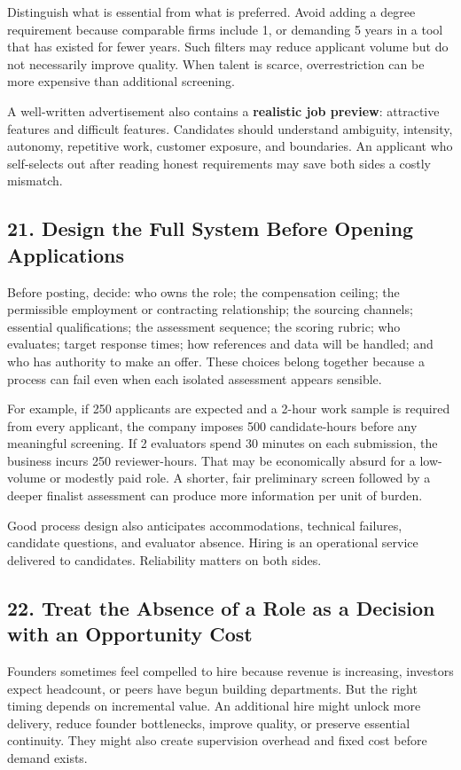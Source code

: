 Distinguish what is essential from what is preferred. Avoid adding a degree requirement because comparable firms include 1, or demanding 5 years in a tool that has existed for fewer years. Such filters may reduce applicant volume but do not necessarily improve quality. When talent is scarce, overrestriction can be more expensive than additional screening.

A well-written advertisement also contains a \textbf{realistic job preview}: attractive features and difficult features. Candidates should understand ambiguity, intensity, autonomy, repetitive work, customer exposure, and boundaries. An applicant who self-selects out after reading honest requirements may save both sides a costly mismatch.

\subsection*{21. Design the Full System Before Opening Applications}

Before posting, decide: who owns the role; the compensation ceiling; the permissible employment or contracting relationship; the sourcing channels; essential qualifications; the assessment sequence; the scoring rubric; who evaluates; target response times; how references and data will be handled; and who has authority to make an offer. These choices belong together because a process can fail even when each isolated assessment appears sensible.

For example, if 250 applicants are expected and a 2-hour work sample is required from every applicant, the company imposes 500 candidate-hours before any meaningful screening. If 2 evaluators spend 30 minutes on each submission, the business incurs 250 reviewer-hours. That may be economically absurd for a low-volume or modestly paid role. A shorter, fair preliminary screen followed by a deeper finalist assessment can produce more information per unit of burden.

Good process design also anticipates accommodations, technical failures, candidate questions, and evaluator absence. Hiring is an operational service delivered to candidates. Reliability matters on both sides.

\subsection*{22. Treat the Absence of a Role as a Decision with an Opportunity Cost}

Founders sometimes feel compelled to hire because revenue is increasing, investors expect headcount, or peers have begun building departments. But the right timing depends on incremental value. An additional hire might unlock more delivery, reduce founder bottlenecks, improve quality, or preserve essential continuity. They might also create supervision overhead and fixed cost before demand exists.

